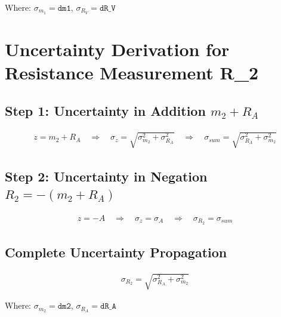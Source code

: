\documentclass{article} %
\begin{document}
Where: $\sigma_{m_1} = \texttt{dm1}$, $\sigma_{R_V} = \texttt{dR\_V}$

\section{Uncertainty Derivation for Resistance Measurement R\_2}
\label{app:e_R2_uncertainty}

\subsection*{Step 1: Uncertainty in Addition $m_2 + R_A$}
\begin{align*}
z = m_2 + R_A \quad \Rightarrow \quad \sigma_z = \sqrt{\sigma_{m_2}^2 + \sigma_{R_A}^2} \quad \Rightarrow \quad \sigma_{sum} = \sqrt{\sigma_{R_A}^2 + \sigma_{m_2}^2}
\end{align*}

\subsection*{Step 2: Uncertainty in Negation $R_2 = -(m_2 + R_A)$}
\begin{align*}
z = -A \quad \Rightarrow \quad \sigma_z = \sigma_A \quad \Rightarrow \quad \sigma_{R_2} = \sigma_{sum}
\end{align*}

\subsection*{Complete Uncertainty Propagation}
\begin{align*}
\sigma_{R_2} = \sqrt{\sigma_{R_A}^2 + \sigma_{m_2}^2}
\end{align*}

Where: $\sigma_{m_2} = \texttt{dm2}$, $\sigma_{R_A} = \texttt{dR\_A}$
\end{document}

